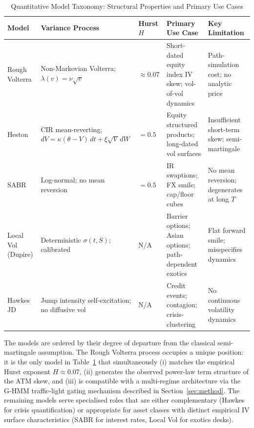 \documentclass[conference]{IEEEtran}
\begin{document}
\begin{table}[t]
  \centering
  \caption{Quantitative Model Taxonomy: Structural Properties and Primary Use Cases}
  \label{tab:taxonomy}
  \renewcommand{\arraystretch}{1.25}
  \begin{tabular}{p{2.2cm} p{2.5cm} p{2.0cm} p{2.8cm} p{3.5cm}}
    \toprule
    \textbf{Model} & \textbf{Variance Process} & \textbf{Hurst $H$} &
    \textbf{Primary Use Case} & \textbf{Key Limitation} \\
    \midrule
    Rough Volterra
      & Non-Markovian Volterra; $\lambda(v)=\nu\sqrt{v}$
      & $\approx 0.07$
      & Short-dated equity index IV skew; vol-of-vol dynamics
      & Path-simulation cost; no analytic price \\
    Heston
      & CIR mean-reverting; $dV=\kappa(\theta-V)\,dt+\xi\sqrt{V}\,dW$
      & $= 0.5$
      & Equity structured products; long-dated vol surfaces
      & Insufficient short-term skew; semi-martingale \\
    SABR
      & Log-normal; no mean reversion
      & $= 0.5$
      & IR swaptions; FX smile; cap/floor cubes
      & No mean reversion; degenerates at long $T$ \\
    Local Vol (Dupire)
      & Deterministic $\sigma(t,S)$; calibrated
      & N/A
      & Barrier options; Asian options; path-dependent exotics
      & Flat forward smile; misspecifies dynamics \\
    Hawkes JD
      & Jump intensity self-excitation; no diffusive vol
      & N/A
      & Credit events; contagion; crisis-clustering
      & No continuous volatility dynamics \\
    \bottomrule
  \end{tabular}
\end{table}

The models are ordered by their degree of departure from the
classical semi-martingale assumption.  The Rough Volterra process
occupies a unique position: it is the only model in Table~\ref{tab:taxonomy}
that simultaneously (i) matches the empirical Hurst exponent
$H \approx 0.07$, (ii) generates the observed power-law term
structure of the ATM skew, and (iii) is compatible with a
multi-regime architecture via the G-HMM traffic-light gating
mechanism described in Section~\ref{sec:method}.  The remaining
models serve specialised roles that are either complementary
(Hawkes for crisis quantification) or appropriate for asset classes
with distinct empirical IV surface characteristics (SABR for
interest rates, Local Vol for exotics desks).
\end{document}
